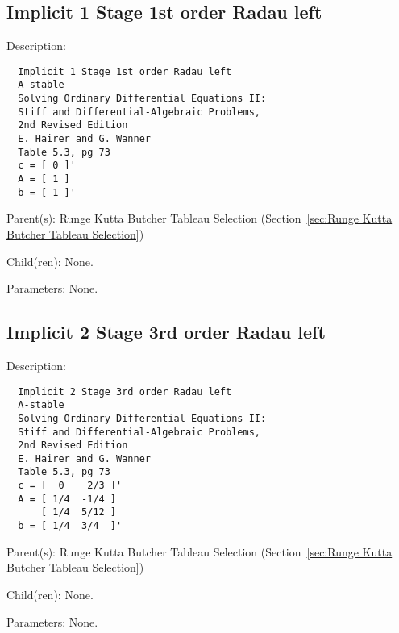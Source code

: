 \subsection{Implicit 1 Stage 1st order Radau left}
\label{sec:Implicit 1 Stage 1st order Radau left}

\begin{list}{}
  {\setlength{\leftmargin}{1.0in}
   \setlength{\labelwidth}{0.75in}
   \setlength{\labelsep}{0.125in}}
  \item[Description:]
\begin{verbatim}
  Implicit 1 Stage 1st order Radau left
  A-stable
  Solving Ordinary Differential Equations II:
  Stiff and Differential-Algebraic Problems,
  2nd Revised Edition
  E. Hairer and G. Wanner
  Table 5.3, pg 73
  c = [ 0 ]'
  A = [ 1 ]
  b = [ 1 ]'
\end{verbatim}
  \item[Parent(s):]
    Runge Kutta Butcher Tableau Selection (Section~\ref{sec:Runge Kutta Butcher Tableau Selection})
  \item[Child(ren):]
    None. 
  \item[Parameters:]
    None. 
\end{list}

\subsection{Implicit 2 Stage 3rd order Radau left}
\label{sec:Implicit 2 Stage 3rd order Radau left}

\begin{list}{}
  {\setlength{\leftmargin}{1.0in}
   \setlength{\labelwidth}{0.75in}
   \setlength{\labelsep}{0.125in}}
  \item[Description:]
\begin{verbatim}
  Implicit 2 Stage 3rd order Radau left
  A-stable
  Solving Ordinary Differential Equations II:
  Stiff and Differential-Algebraic Problems,
  2nd Revised Edition
  E. Hairer and G. Wanner
  Table 5.3, pg 73
  c = [  0    2/3 ]'
  A = [ 1/4  -1/4 ]
      [ 1/4  5/12 ]
  b = [ 1/4  3/4  ]'
\end{verbatim}
  \item[Parent(s):]
    Runge Kutta Butcher Tableau Selection (Section~\ref{sec:Runge Kutta Butcher Tableau Selection})
  \item[Child(ren):]
    None. 
  \item[Parameters:]
    None. 
\end{list}

